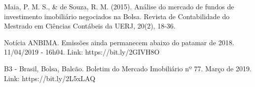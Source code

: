 \documentclass[
	12pt,				%
	openany,			%
  oneside,      %
	a4paper,			%
	english,			%
	french,				%
	spanish,			%
	brazil				%
	]{abntex2}
\begin{document}
\noindent Maia, P. M. S., \& de Souza, R. M. (2015). Análise do mercado de fundos de investimento imobiliário negociados na Bolsa. Revista de Contabilidade do Mestrado em Ciências Contábeis da UERJ, 20(2), 18-36.

\noindent Notícia ANBIMA. Emissões ainda permanecem abaixo do patamar de 2018. 11/04/2019 - 16h04. Link: https://bit.ly/2GIVH8O

\noindent B3 - Brasil, Bolsa, Balcão. Boletim do Mercado Imobiliário nº 77. Março de 2019. Link: https://bit.ly/2L5xLAQ

%
%











\end{document}
